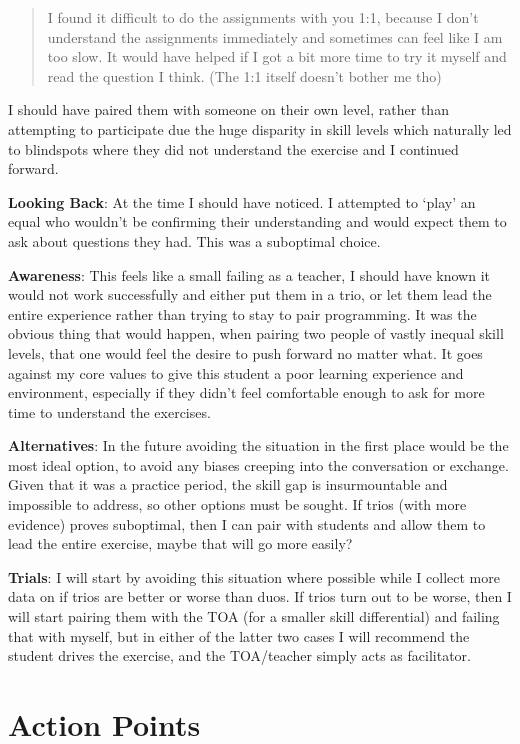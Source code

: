 \documentclass[paper=a4,justified,a4paper]{tufte-handout}
\begin{document}
\begin{quote}
I found it difficult to do the assignments with you 1:1, because I don't
understand the assignments immediately and sometimes can feel like I am
too slow. It would have helped if I got a bit more time to try it myself
and read the question I think. (The 1:1 itself doesn't bother me tho)
\end{quote}

I should have paired them with someone on their own level, rather than
attempting to participate due the huge disparity in skill levels which
naturally led to blindspots where they did not understand the exercise
and I continued forward.

\textbf{Looking Back}: At the time I should have noticed. I attempted to
`play' an equal who wouldn't be confirming their understanding and would
expect them to ask about questions they had. This was a suboptimal
choice.

\textbf{Awareness}: This feels like a small failing as a teacher, I
should have known it would not work successfully and either put them in
a trio, or let them lead the entire experience rather than trying to
stay to pair programming. It was the obvious thing that would happen,
when pairing two people of vastly inequal skill levels, that one would
feel the desire to push forward no matter what. It goes against my core
values to give this student a poor learning experience and environment,
especially if they didn't feel comfortable enough to ask for more time
to understand the exercises.

\textbf{Alternatives}: In the future avoiding the situation in the first
place would be the most ideal option, to avoid any biases creeping into
the conversation or exchange. Given that it was a practice period, the
skill gap is insurmountable and impossible to address, so other options
must be sought. If trios (with more evidence) proves suboptimal, then I
can pair with students and allow them to lead the entire exercise, maybe
that will go more easily?

\textbf{Trials}: I will start by avoiding this situation where possible
while I collect more data on if trios are better or worse than duos. If
trios turn out to be worse, then I will start pairing them with the TOA
(for a smaller skill differential) and failing that with myself, but in
either of the latter two cases I will recommend the student drives the
exercise, and the TOA/teacher simply acts as facilitator.

\hypertarget{action-points}{%
\section{Action Points}\label{action-points}}
\end{document}
